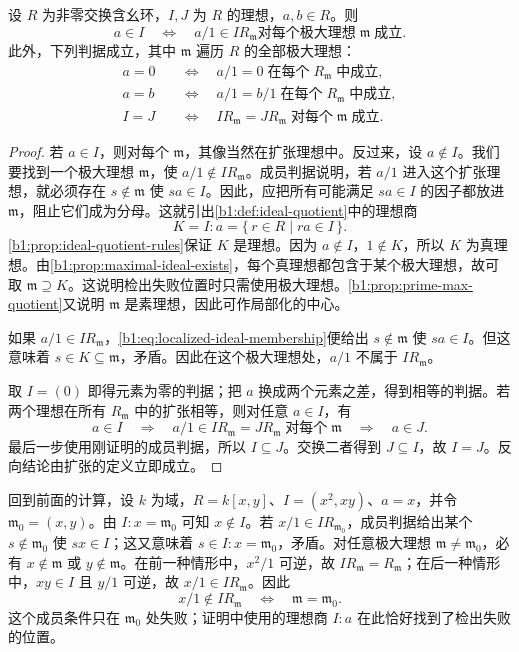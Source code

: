 \begin{proposition}\label{b1:prop:local-detection}
	设 \(R\) 为非零交换含幺环，\(I,J\) 为 \(R\) 的理想，\(a,b\in R\)。则
	\[
		a\in I \quad\Longleftrightarrow\quad a/1\in IR_{\mathfrak m} \text{对每个极大理想}\;\mathfrak m\;\text{成立}.
	\]
	此外，下列判据成立，其中 \(\mathfrak m\) 遍历 \(R\) 的全部极大理想：
	\[
		\begin{aligned}
			a=0 &\quad\Longleftrightarrow\quad a/1=0\;\text{在每个}\;R_{\mathfrak m}\;\text{中成立},\\
			a=b &\quad\Longleftrightarrow\quad a/1=b/1\;\text{在每个}\;R_{\mathfrak m}\;\text{中成立},\\
			I=J &\quad\Longleftrightarrow\quad IR_{\mathfrak m}=JR_{\mathfrak m}\;\text{对每个}\;\mathfrak m\;\text{成立}.
		\end{aligned}
	\]
\end{proposition}
\begin{proof}
	若 \(a\in I\)，则对每个 \(\mathfrak m\)，其像当然在扩张理想中。反过来，设 \(a\notin I\)。我们要找到一个极大理想 \(\mathfrak m\)，使 \(a/1\notin IR_{\mathfrak m}\)。成员判据说明，若 \(a/1\) 进入这个扩张理想，就必须存在 \(s\notin\mathfrak m\) 使 \(sa\in I\)。因此，应把所有可能满足 \(sa\in I\) 的因子都放进 \(\mathfrak m\)，阻止它们成为分母。这就引出\cref{b1:def:ideal-quotient}中的理想商
	\[
		K=I:a=\{\,r\in R\mid ra\in I\,\}.
	\]
	\cref{b1:prop:ideal-quotient-rules}保证 \(K\) 是理想。因为 \(a\notin I\)，\(1\notin K\)，所以 \(K\) 为真理想。由\cref{b1:prop:maximal-ideal-exists}，每个真理想都包含于某个极大理想，故可取 \(\mathfrak m\supseteq K\)。这说明检出失败位置时只需使用极大理想。\cref{b1:prop:prime-max-quotient}又说明 \(\mathfrak m\) 是素理想，因此可作局部化的中心。

	如果 \(a/1\in IR_{\mathfrak m}\)，\eqref{b1:eq:localized-ideal-membership}便给出 \(s\notin\mathfrak m\) 使 \(sa\in I\)。但这意味着 \(s\in K\subseteq\mathfrak m\)，矛盾。因此在这个极大理想处，\(a/1\) 不属于 \(IR_{\mathfrak m}\)。

	取 \(I=(0)\) 即得元素为零的判据；把 \(a\) 换成两个元素之差，得到相等的判据。若两个理想在所有 \(R_{\mathfrak m}\) 中的扩张相等，则对任意 \(a\in I\)，有
	\[
		a\in I \quad\Longrightarrow\quad a/1\in IR_{\mathfrak m}=JR_{\mathfrak m}\;\text{对每个}\;\mathfrak m \quad\Longrightarrow\quad a\in J.
	\]
	最后一步使用刚证明的成员判据，所以 \(I\subseteq J\)。交换二者得到 \(J\subseteq I\)，故 \(I=J\)。反向结论由扩张的定义立即成立。
\end{proof}

回到前面的计算，设 \(k\) 为域，\(R=k[x,y]\)、\(I=(x^2,xy)\)、\(a=x\)，并令 \(\mathfrak m_0=(x,y)\)。由 \(I:x=\mathfrak m_0\) 可知 \(x\notin I\)。若 \(x/1\in IR_{\mathfrak m_0}\)，成员判据给出某个 \(s\notin\mathfrak m_0\) 使 \(sx\in I\)；这又意味着 \(s\in I:x=\mathfrak m_0\)，矛盾。对任意极大理想 \(\mathfrak m\ne\mathfrak m_0\)，必有 \(x\notin\mathfrak m\) 或 \(y\notin\mathfrak m\)。在前一种情形中，\(x^2/1\) 可逆，故 \(IR_{\mathfrak m}=R_{\mathfrak m}\)；在后一种情形中，\(xy\in I\) 且 \(y/1\) 可逆，故 \(x/1\in IR_{\mathfrak m}\)。因此
\[
	x/1\notin IR_{\mathfrak m} \quad\Longleftrightarrow\quad \mathfrak m=\mathfrak m_0.
\]
这个成员条件只在 \(\mathfrak m_0\) 处失败；证明中使用的理想商 \(I:a\) 在此恰好找到了检出失败的位置。

